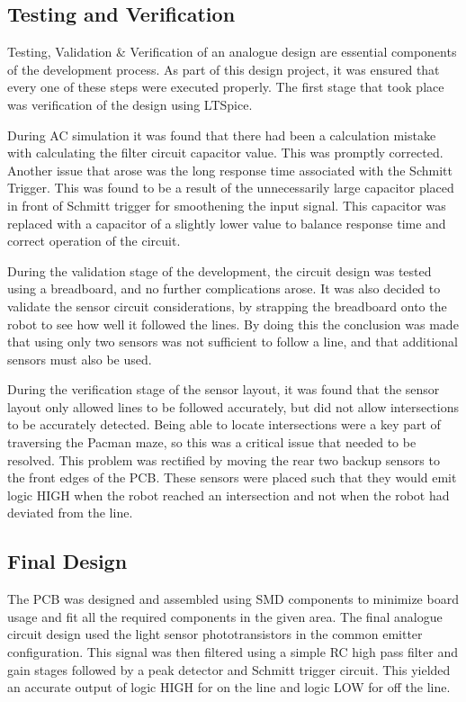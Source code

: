 \documentclass{article}
\begin{document}
\subsection{Testing and Verification}

Testing, Validation \& Verification of an analogue design are essential components of the development process. As part of this design project, it was ensured that every one of these steps were executed properly. The first stage that took place was verification of the design using LTSpice.

During AC simulation it was found that there had been a calculation mistake with calculating the filter circuit capacitor value. This was promptly corrected. Another issue that arose was the long response time associated with the Schmitt Trigger. This was found to be a result of the unnecessarily large capacitor placed in front of Schmitt trigger for smoothening the input signal. This capacitor was replaced with a capacitor of a slightly lower value to balance response time and correct operation of the circuit.

During the validation stage of the development, the circuit design was tested using a breadboard, and no further complications arose. It was also decided to validate the sensor circuit considerations, by strapping the breadboard onto the robot to see how well it followed the lines. By doing this the conclusion was made that using only two sensors was not sufficient to follow a line, and that additional sensors must also be used. 

During the verification stage of the sensor layout, it was found that the sensor layout only allowed lines to be followed accurately, but did not allow intersections to be accurately detected. Being able to locate intersections were a key part of traversing the Pacman maze, so this was a critical issue that needed to be resolved. This problem was rectified by moving the rear two backup sensors to the front edges of the PCB. These sensors were placed such that they would emit logic HIGH when the robot reached an intersection and not when the robot had deviated from the line.

\subsection{Final Design}

The PCB was designed and assembled using SMD components to minimize board usage and fit all the required components in the given area. The final analogue circuit design used the light sensor phototransistors in the common emitter configuration. This signal was then filtered using a simple RC high pass filter and gain stages followed by a peak detector and Schmitt trigger circuit. This yielded an accurate output of logic HIGH for on the line and logic LOW for off the line.
\end{document}
